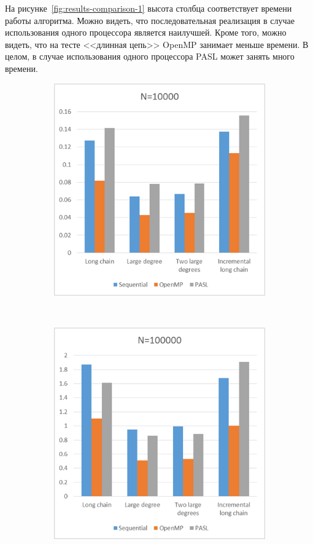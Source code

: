 \documentclass[specification,annotation]{itmo-student-thesis}
\begin{document}
На рисунке~\ref{fig:results-comparison-1} высота столбца соответствует времени работы алгоритма. 
Можно видеть, что последовательная реализация в случае использования одного процессора является наилучшей. 
Кроме того, можно видеть, что на тесте <<длинная цепь>> OpenMP занимает меньше времени. В целом, в случае использования одного процессора PASL может занять много времени.

\begin{figure}[!ht]
\centering
\begin{subfigure}[b]{0.45\textwidth}
    \includegraphics[width=\textwidth]{pic/results-2-a.png}
\end{subfigure}~~\begin{subfigure}[b]{0.45\textwidth}
    \includegraphics[width=\textwidth]{pic/results-2-b.png}

\end{subfigure}
\end{figure}
\end{document}
